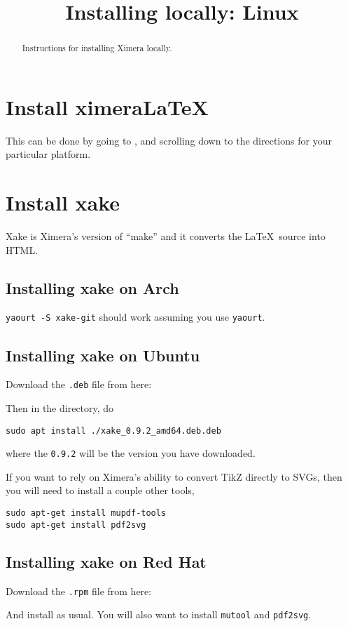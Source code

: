 \documentclass{ximera}
\title{Installing locally: Linux}
\begin{document}
\begin{abstract}
Instructions for installing Ximera locally.
\end{abstract}
\maketitle



\section{Install ximeraLaTeX}

This can be done by going to , and scrolling
down to the directions for your particular platform.




\section{Install xake}

Xake is Ximera's version of ``make'' and it converts the
\LaTeX\ source into HTML.

\subsection{Installing xake on Arch}

\verb!yaourt -S xake-git! should work assuming you use \texttt{yaourt}.

  
\subsection{Installing xake on Ubuntu}

Download the \verb|.deb| file from here:


Then in the directory, do

\begin{verbatim}
sudo apt install ./xake_0.9.2_amd64.deb.deb
\end{verbatim}

where the \verb|0.9.2| will be the version you have downloaded.

If you want to rely on Ximera's ability to convert TikZ directly to SVGs, then you will need to install a couple other tools,
\begin{verbatim}
sudo apt-get install mupdf-tools
sudo apt-get install pdf2svg
\end{verbatim}

\subsection{Installing xake on Red Hat}

Download the \verb|.rpm| file from here:


And install as usual.  You will also want to install \verb|mutool| and \verb|pdf2svg|.
\end{document}
